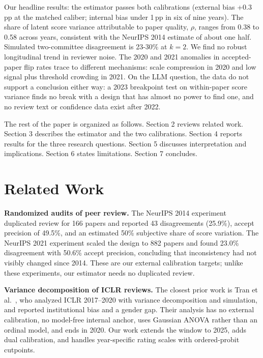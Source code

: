 \documentclass[10pt]{article}
\begin{document}
Our headline results: the estimator passes both calibrations (external bias +0.3\,pp at the matched caliber; internal bias under 1\,pp in six of nine years). The share of latent score variance attributable to paper quality, $\rho$, ranges from 0.38 to 0.58 across years, consistent with the NeurIPS 2014 estimate of about one half. Simulated two-committee disagreement is 23-30\% at $k=2$. We find no robust longitudinal trend in reviewer noise. The 2020 and 2021 anomalies in accepted-paper flip rates trace to different mechanisms: scale compression in 2020 and low signal plus threshold crowding in 2021. On the LLM question, the data do not support a conclusion either way: a 2023 breakpoint test on within-paper score variance finds no break with a design that has almost no power to find one, and no review text or confidence data exist after 2022.

The rest of the paper is organized as follows. Section 2 reviews related work. Section 3 describes the estimator and the two calibrations. Section 4 reports results for the three research questions. Section 5 discusses interpretation and implications. Section 6 states limitations. Section 7 concludes.

\section{Related Work}

\textbf{Randomized audits of peer review.} The NeurIPS 2014 experiment \citep{cortes2021} duplicated review for 166 papers and reported 43 disagreements (25.9\%), accept precision of 49.5\%, and an estimated 50\% subjective share of score variation. The NeurIPS 2021 experiment \citep{beygelzimer2023} scaled the design to 882 papers and found 23.0\% disagreement with 50.6\% accept precision, concluding that inconsistency had not visibly changed since 2014. These are our external calibration targets; unlike these experiments, our estimator needs no duplicated review.

\textbf{Variance decomposition of ICLR reviews.} The closest prior work is Tran et al.~\citep{tran2020}, who analyzed ICLR 2017--2020 with variance decomposition and simulation, and reported institutional bias and a gender gap. Their analysis has no external calibration, no model-free internal anchor, uses Gaussian ANOVA rather than an ordinal model, and ends in 2020. Our work extends the window to 2025, adds dual calibration, and handles year-specific rating scales with ordered-probit cutpoints.
\end{document}
